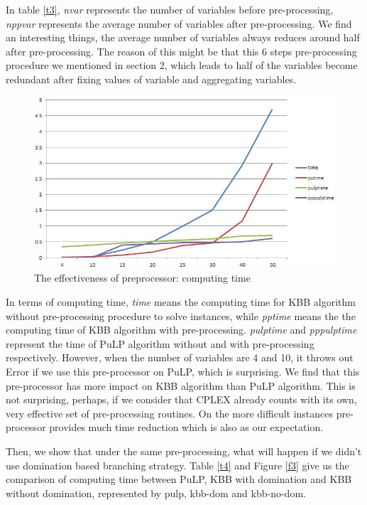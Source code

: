 \documentclass[a4paper,11pt]{article}
\begin{document}
In table \ref{t3}, \textit{nvar} represents the number of variables before pre-processing, \textit{nppvar} represents the average number of variables after pre-processing.  We find an interesting things, the average number of variables always reduces around half after pre-processing. The reason of this might be that this $6$ steps pre-processing procedure we mentioned in section 2, which leads to half of the variables become redundant after fixing values of variable and aggregating variables. 

\begin{figure}[H]
\begin{center}
\includegraphics[scale=0.6]{3}
\end{center}
\caption{The effectiveness of preprocessor: computing time \label{numfigp}}
\end{figure}

In terms of computing time, \textit{time} means the computing time for KBB algorithm without pre-processing procedure to solve instances,  while \textit{pptime} means the the computing time of KBB algorithm with pre-processing. \textit{pulptime} and \textit{pppulptime} represent the time of PuLP algorithm without and with pre-processing respectively. However, when the number of variables are 4 and 10, it throws out Error if we use this pre-processor on PuLP, which is surprising. We find that this pre-processor has more impact on KBB algorithm than PuLP algorithm. This is not surprising, perhaps, if we consider that CPLEX already counts with its own, very effective set of pre-processing routines. On the more difficult instances pre-processor provides much time reduction which is also as our expectation.

Then, we show that under the same pre-processing, what will happen if we didn't use domination based branching strategy. Table \ref{t4} and Figure \ref{f3} give us the comparison of computing time between PuLP, KBB with domination and KBB without domination, represented by pulp, kbb-dom and kbb-no-dom.
\end{document}
